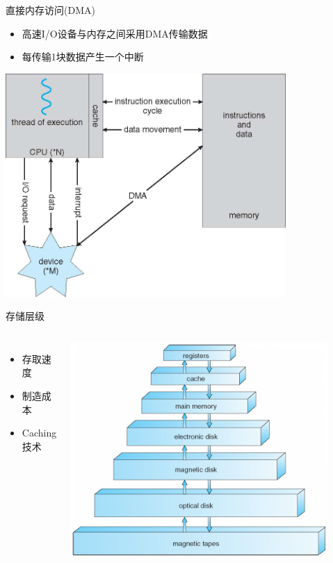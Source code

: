 \documentclass[xcolor=svgnames]{beamer}
\begin{document}
\begin{CJK*}{UTF8}{gbsn}
\begin{frame}{直接内存访问(DMA)}
\begin{itemize}
\item 高速I/O设备与内存之间采用DMA传输数据
\item 每传输1块数据产生一个中断
\end{itemize}
\includegraphics[width=0.8\textwidth]{vonneumann.jpg}
\end{frame}

\begin{frame}{存储层级}
\begin{columns}
\begin{itemize}
\item 存取速度
\item 制造成本
\item Caching技术
\end{itemize}
\includegraphics[width=0.9\textwidth]{storage.png}
\end{columns}
\end{frame}


\end{CJK*}
\end{document}
